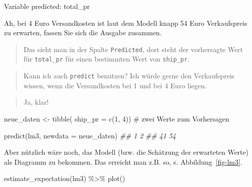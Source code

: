 \documentclass[
  a4paper,
]{scrbook}
\newenvironment{Shaded}{\begin{snugshade}}{\end{snugshade}}
\newcommand{\AttributeTok}[1]{\textcolor[rgb]{0.40,0.45,0.13}{#1}}
\newcommand{\CommentTok}[1]{\textcolor[rgb]{0.37,0.37,0.37}{#1}}
\newcommand{\DecValTok}[1]{\textcolor[rgb]{0.68,0.00,0.00}{#1}}
\newcommand{\DocumentationTok}[1]{\textcolor[rgb]{0.37,0.37,0.37}{\textit{#1}}}
\newcommand{\FunctionTok}[1]{\textcolor[rgb]{0.28,0.35,0.67}{#1}}
\newcommand{\NormalTok}[1]{\textcolor[rgb]{0.00,0.23,0.31}{#1}}
\newcommand{\OtherTok}[1]{\textcolor[rgb]{0.00,0.23,0.31}{#1}}
\newcommand{\SpecialCharTok}[1]{\textcolor[rgb]{0.37,0.37,0.37}{#1}}
\theoremstyle{definition}
\theoremstyle{definition}
\theoremstyle{definition}
\theoremstyle{remark}
\begin{document}
Variable predicted: total\_pr

Ah, bei 4 Euro Versandkosten ist laut dem Modell knapp 54 Euro
Verkaufspreis zu erwarten, fassen Sie sich die Ausgabe zusammen.

\begin{quote}
{} Das sieht man in der Spalte \texttt{Predicted}, dort
steht der vorhersagte Wert für \texttt{total\_pr} für einen bestimmten
Wert von \texttt{ship\_pr}.
\end{quote}

\begin{quote}
{} Kann ich auch \texttt{predict} benutzen? Ich würde
gerne den Verkaufspreis wissen, wenn die Versandkosten bei 1 und bei 4
Euro liegen.
\end{quote}

\begin{quote}
{} Ja, klar!
\end{quote}

\begin{Shaded}
\begin{Highlighting}[]
\NormalTok{neue\_daten }\OtherTok{\textless{}{-}} \FunctionTok{tibble}\NormalTok{(}
  \AttributeTok{ship\_pr =} \FunctionTok{c}\NormalTok{(}\DecValTok{1}\NormalTok{, }\DecValTok{4}\NormalTok{)) }\CommentTok{\# zwei Werte zum Vorhersagen}
\end{Highlighting}
\end{Shaded}

\begin{Shaded}
\begin{Highlighting}[]
\FunctionTok{predict}\NormalTok{(lm3, }\AttributeTok{newdata =}\NormalTok{ neue\_daten)}
\DocumentationTok{\#\#  1  2 }
\DocumentationTok{\#\# 41 54}
\end{Highlighting}
\end{Shaded}

Aber nützlich wäre noch, das Modell (bzw. die Schätzung der erwarteten
Werte) als Diagramm zu bekommen. Das erreicht man z.B. so, s.
Abbildung~\ref{fig-lm3}.

\begin{Shaded}
\begin{Highlighting}[]
\FunctionTok{estimate\_expectation}\NormalTok{(lm3) }\SpecialCharTok{\%\textgreater{}\%} \FunctionTok{plot}\NormalTok{()}
\end{Highlighting}
\end{Shaded}
\end{document}
